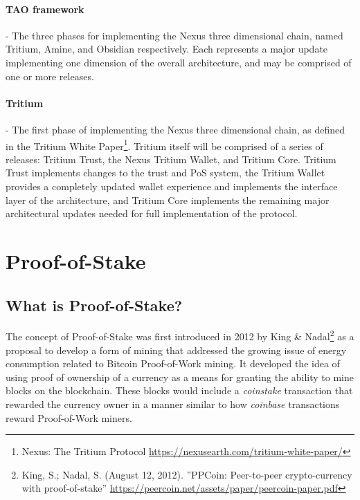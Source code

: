 \documentclass[11pt]{article}
\begin{document}
\paragraph{TAO framework}- The three phases for implementing the Nexus three dimensional chain, named Tritium, Amine, and Obsidian respectively. Each represents a major update implementing one dimension of the overall architecture, and may be comprised of one or more releases. 

\paragraph{Tritium}- The first phase of implementing the Nexus three dimensional chain, as defined in the Tritium White Paper\footnote{Nexus: The Tritium Protocol \url{https://nexusearth.com/tritium-white-paper/}}. Tritium itself will be comprised of a series of releases: Tritium Trust, the Nexus Tritium Wallet, and Tritium Core. Tritium Trust implements changes to the trust and PoS system, the Tritium Wallet provides a completely updated wallet experience and implements the interface layer of the architecture, and Tritium Core implements the remaining major architectural updates needed for full implementation of the protocol. \\

\bigskip

\section{Proof-of-Stake}

\subsection{What is Proof-of-Stake?}
The concept of Proof-of-Stake was first introduced in 2012 by King \& Nadal\footnote{King, S.; Nadal, S. (August 12, 2012). ”PPCoin: Peer-to-peer crypto-currency  with  proof-of-stake” \url{https://peercoin.net/assets/paper/peercoin-paper.pdf}} as a proposal to develop a form of mining that addressed the growing issue of energy consumption related to Bitcoin Proof-of-Work mining. It developed the idea of using proof of ownership of a currency as a means for granting the ability to mine blocks on the blockchain. These blocks would include a \textit{coinstake} transaction that rewarded the currency owner in a manner similar to how \textit{coinbase} transactions reward Proof-of-Work miners.\\
\end{document}
